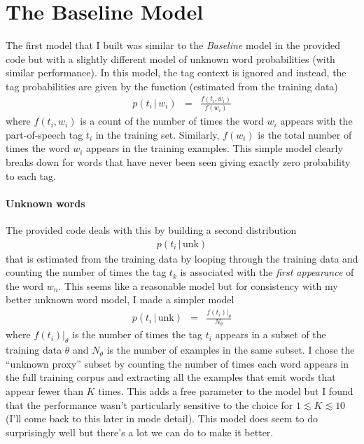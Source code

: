 \documentclass[11pt]{article}
\newcommand{\eqlabel}[1]{\label{eq:#1}}
\begin{document}
\section{The Baseline Model}

The first model that I built was similar to the \emph{Baseline} model in the
provided code but with a slightly different model of unknown word
probabilities (with similar performance).
In this model, the tag context is ignored and instead, the tag probabilities
are given by the function (estimated from the training data)
\begin{eqnarray}\eqlabel{cond-emission}
p(t_i\,|\,w_i) &=& \frac{f(t_i,w_i)}{f(w_i)}
\end{eqnarray}
where $f(t_i, w_i)$ is a count of the number of times the word $w_i$ appears
with the part-of-speech tag $t_i$ in the training set.
Similarly, $f(w_i)$ is the total number of times the word $w_i$ appears in the
training examples.
This simple model clearly breaks down for words that have never been seen
giving exactly zero probability to each tag.

\paragraph{Unknown words}
The provided code deals with this by building a second distribution
\begin{eqnarray}
p(t_i\,|\,\mathrm{unk})
\end{eqnarray}
that is estimated from the training data by looping through the training data
and counting the number of times the tag $t_k$ is associated with the
\emph{first appearance} of the word $w_n$.
This seems like a reasonable model but for consistency with my better unknown
word model, I made a simpler model
\begin{eqnarray}
p(t_i\,|\,\mathrm{unk}) &=& \frac{\left . f(t_i)\right |_\theta}{N_\theta}
\end{eqnarray}
where $\left.f(t_i)\right|_\theta$ is the number of times the tag $t_i$
appears in a subset of the training data $\theta$ and $N_\theta$ is the number
of examples in the same subset.
I chose the ``unknown proxy'' subset by counting the number of times each word
appears in the full training corpus and extracting all the examples that emit
words that appear fewer than $K$ times.
This adds a free parameter to the model but I found that the performance
wasn't particularly sensitive to the choice for $1 \lesssim K \lesssim 10$
(I'll come back to this later in mode detail).
This model does seem to do surprisingly well but there's a lot we can do to
make it better.
\end{document}

